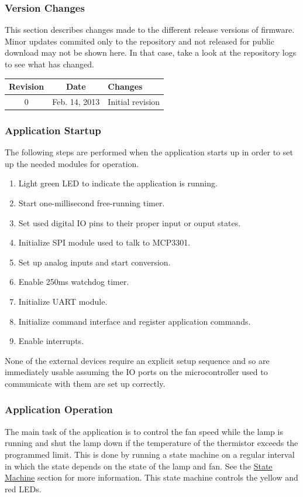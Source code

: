 \documentclass{article}
\begin{document}
\subsubsection{Version Changes} \label{sssec:FWAppChanges}
This section describes changes made to the different release versions of firmware.  Minor updates
commited only to the repository and not released for public download may not be shown here.  In that
case, take a look at the repository logs to see what has changed.

\begin{center}
    \begin{tabular}{c|c|p{}}
        Revision & Date & Changes \\
        \hline
        0 & Feb. 14, 2013 & Initial revision \\
    \end{tabular}
\end{center}

\subsubsection{Application Startup} \label{sssec:FWAppStartup}
The following steps are performed when the application starts up in order to set up the needed
modules for operation.

\begin{enumerate}
  \item Light green LED to indicate the application is running.
  \item Start one-millisecond free-running timer.
  \item Set used digital IO pins to their proper input or ouput states.
  \item Initialize SPI module used to talk to MCP3301.
  \item Set up analog inputs and start conversion.
  \item Enable 250ms watchdog timer.
  \item Initialize UART module.
  \item Initialize command interface and register application commands.
  \item Enable interrupts.
\end{enumerate}

None of the external devices require an explicit setup sequence and so are immediately usable
assuming the IO ports on the microcontroller used to communicate with them are set up correctly.

\subsubsection{Application Operation} \label{sssec:FWAppOperation} 
The main task of the application is to control the fan speed while the lamp is running and shut the
lamp down if the temperature of the thermistor exceeds the programmed limit.  This is done by
running a state machine on a regular interval in which the state depends on the state of the lamp
and fan.  See the \hyperref[sssec:FWAppStateMachine]{State Machine} section for more information.
This state machine controls the yellow and red LEDs.
\end{document}

